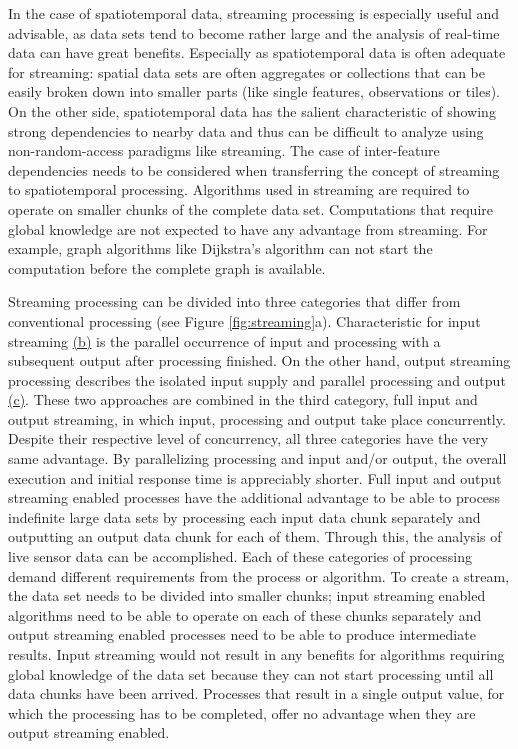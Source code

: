 	In the case of spatiotemporal data, streaming processing is especially useful and advisable, as data sets tend to become rather large and the analysis of real-time data can have great benefits. Especially as spatiotemporal data is often adequate for streaming: spatial data sets are often aggregates or collections that can be easily broken down into smaller parts (like single features, observations or tiles). On the other side, spatiotemporal data has the salient characteristic of showing strong dependencies to nearby data and thus can be difficult to analyze using non-random-access paradigms like streaming. The case of inter-feature dependencies needs to be considered when transferring the concept of streaming to spatiotemporal processing. Algorithms used in streaming are required to operate on smaller chunks of the complete data set. Computations that require global knowledge are not expected to have any advantage from streaming. For example, graph algorithms like Dijkstra's algorithm \citep{dijkstra} can not start the computation before the complete graph is available.

	Streaming processing can be divided into three categories that differ from conventional processing (see Figure \ref{fig:streaming}a). Characteristic for input streaming \hyperref[fig:streaming]{(b)} is the parallel occurrence of input and processing with a subsequent output after processing finished. On the other hand, output streaming processing describes the isolated input supply and parallel processing and output \hyperref[fig:streaming]{(c)}. These two approaches are combined in the third category, full input and output streaming, in which input, processing and output take place concurrently. Despite their respective level of concurrency, all three categories have the very same advantage. By parallelizing processing and input and/or output, the overall execution and initial response time is appreciably shorter. Full input and output streaming enabled processes have the additional advantage to be able to process indefinite large data sets by processing each input data chunk separately and outputting an output data chunk for each of them. Through this, the analysis of live sensor data can be accomplished. Each of these categories of processing demand different requirements from the process or algorithm. To create a stream, the data set needs to be divided into smaller chunks; input streaming enabled algorithms need to be able to operate on each of these chunks separately and output streaming enabled processes need to be able to produce intermediate results. Input streaming would not result in any benefits for algorithms requiring global knowledge of the data set because they can not start processing until all data chunks have been arrived. Processes that result in a single output value, for which the processing has to be completed, offer no advantage when they are output streaming enabled.

